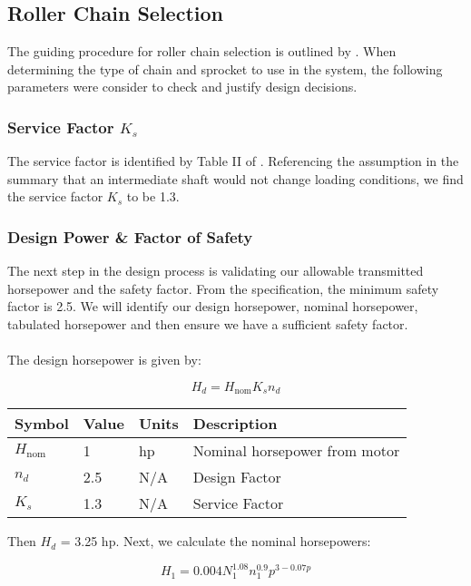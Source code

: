 \documentclass[letterpaper,12pt]{article}
\begin{document}
\subsection{Roller Chain Selection}
The guiding procedure for roller chain selection is outlined by \cite{martin}. When determining the type of chain and sprocket to use in the system, the following parameters were consider to check and justify design decisions.

\subsubsection{Service Factor $K_s$}
The service factor is identified by Table II of \cite{martin}. Referencing the assumption in the summary that an intermediate shaft would not change loading conditions, we find the service factor $K_s$ to be 1.3.

\subsubsection{Design Power \& Factor of Safety}
The next step in the design process is validating our allowable transmitted horsepower and the safety factor. From the specification, the minimum safety factor is 2.5. We will identify our design horsepower, nominal horsepower, tabulated horsepower and then ensure we have a sufficient safety factor.
\\\\
The design horsepower is given by:

\begin{equation}
    H_d = H_{\text{nom}}K_s n_d
\end{equation}

\begin{center}
	\begin{tabular}{ |p{1.5cm}||p{1cm}|p{2cm}|p{7cm}|  }
		\hline
		Symbol & Value & Units & Description\\
		\hline
		$H_{\text{nom}}$ & 1 & hp & Nominal horsepower from motor\\
        $n_d$ & 2.5 & N/A  & Design Factor\\			
		$K_s$ & 1.3 & N/A  & Service Factor\\
		\hline
	\end{tabular}
\end{center}
Then $H_d$ = 3.25 hp. Next, we calculate the nominal horsepowers:

\begin{equation}
    H_1 = 0.004 N_1^{1.08} n_1^{0.9} p^{3-0.07p}
\end{equation}
\end{document}
